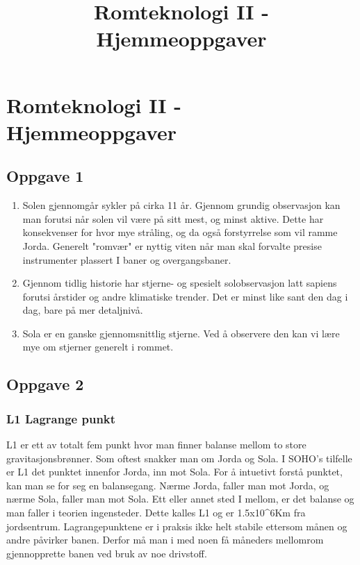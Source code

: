 \documentclass[11pt]{article}
\title{Romteknologi II - Hjemmeoppgaver}
\providecommand{\tightlist}{%
      \setlength{\itemsep}{0pt}\setlength{\parskip}{0pt}}
\begin{document}
    
    
    \maketitle
    
    

    
    \section{Romteknologi II -
Hjemmeoppgaver}\label{romteknologi-ii---hjemmeoppgaver}

    \subsection{Oppgave 1}\label{oppgave-1}

    \begin{enumerate}
\def\labelenumi{\arabic{enumi}.}
\tightlist
\item
  Solen gjennomgår sykler på cirka 11 år. Gjennom grundig observasjon
  kan man forutsi når solen vil være på sitt mest, og minst aktive.
  Dette har konsekvenser for hvor mye stråling, og da også forstyrrelse
  som vil ramme Jorda. Generelt "romvær" er nyttig viten når man skal
  forvalte presise instrumenter plassert I baner og overgangsbaner.
\item
  Gjennom tidlig historie har stjerne- og spesielt solobservasjon latt
  sapiens forutsi årstider og andre klimatiske trender. Det er minst
  like sant den dag i dag, bare på mer detaljnivå.
\item
  Sola er en ganske gjennomsnittlig stjerne. Ved å observere den kan vi
  lære mye om stjerner generelt i rommet.
\end{enumerate}

    \subsection{Oppgave 2}\label{oppgave-2}

    \subsubsection{L1 Lagrange punkt}\label{l1-lagrange-punkt}

L1 er ett av totalt fem punkt hvor man finner balanse mellom to store
gravitasjonsbrønner. Som oftest snakker man om Jorda og Sola. I SOHO's
tilfelle er L1 det punktet innenfor Jorda, inn mot Sola. For å intuetivt
forstå punktet, kan man se for seg en balansegang. Nærme Jorda, faller
man mot Jorda, og nærme Sola, faller man mot Sola. Ett eller annet sted
I mellom, er det balanse og man faller i teorien ingensteder. Dette
kalles L1 og er 1.5x10\^{}6Km fra jordsentrum. Lagrangepunktene er i
praksis ikke helt stabile ettersom månen og andre påvirker banen. Derfor
må man i med noen få måneders mellomrom gjennopprette banen ved bruk av
noe drivstoff.
\end{document}
